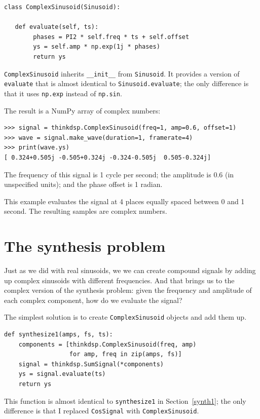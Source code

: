 \documentclass[12pt]{book}
\begin{document}
\begin{verbatim}
class ComplexSinusoid(Sinusoid):
 
   def evaluate(self, ts):
        phases = PI2 * self.freq * ts + self.offset
        ys = self.amp * np.exp(1j * phases)
        return ys
\end{verbatim}

{\tt ComplexSinusoid} inherits \verb"__init__" from
{\tt Sinusoid}.  It provides a version of {\tt evaluate}
that is almost identical to {\tt Sinusoid.evaluate}; the
only difference is that it uses {\tt np.exp} instead of
{\tt np.sin}.

The result is a NumPy array of complex numbers:

\begin{verbatim}
>>> signal = thinkdsp.ComplexSinusoid(freq=1, amp=0.6, offset=1)
>>> wave = signal.make_wave(duration=1, framerate=4)
>>> print(wave.ys)
[ 0.324+0.505j -0.505+0.324j -0.324-0.505j  0.505-0.324j]
\end{verbatim}

The frequency of this signal is 1 cycle per second; the amplitude
is 0.6 (in unspecified units); and the phase offset is 1 radian.

This example evaluates the signal at 4 places equally spaced between
0 and 1 second.  The resulting samples are complex numbers.


\section{The synthesis problem}

Just as we did with real sinusoids, we we can create compound signals
by adding up complex sinusoids with different frequencies.  And that
brings us to the complex version of the synthesis problem: given the
frequency and amplitude of each complex component, how do we evaluate the
signal?

The simplest solution is to create {\tt ComplexSinusoid} objects and
add them up.

\begin{verbatim}
def synthesize1(amps, fs, ts):
    components = [thinkdsp.ComplexSinusoid(freq, amp)
                  for amp, freq in zip(amps, fs)]
    signal = thinkdsp.SumSignal(*components)
    ys = signal.evaluate(ts)
    return ys
\end{verbatim}

This function is almost identical to {\tt synthesize1} in
Section~\ref{synth1}; the only difference is that I replaced
{\tt CosSignal} with {\tt ComplexSinusoid}.
\end{document}
